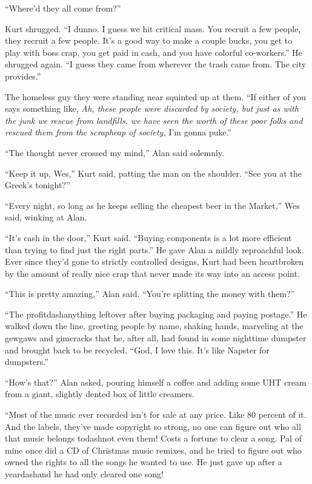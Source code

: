 ``Where'd they all come from?''

Kurt shrugged.  ``I dunno.  I guess we hit critical mass.  You recruit
a few people, they recruit a few people.  It's a good way to make a
couple bucks, you get to play with boss crap, you get paid in cash,
and you have colorful co-workers.'' He shrugged again.  ``I guess they
came from wherever the trash came from.  The city provides.''

The homeless guy they were standing near squinted up at them.  ``If
either of you says something like, \textit{Ah, these people were
discarded by society, but just as with the junk we rescue from
landfills, we have seen the worth of these poor folks and rescued them
from the scrapheap of society,} I'm gonna puke.''

``The thought never crossed my mind,'' Alan said solemnly.

``Keep it up, Wes,'' Kurt said, patting the man on the shoulder. 
``See you at the Greek's tonight?''

``Every night, so long as he keeps selling the cheapest beer in the
Market,'' Wes said, winking at Alan.

``It's cash in the door,'' Kurt said.  ``Buying components is a lot
more efficient than trying to find just the right parts.'' He gave
Alan a mildly reproachful look.  Ever since they'd gone to strictly
controlled designs, Kurt had been heartbroken by the amount of really
nice crap that never made its way into an access point.

``This is pretty amazing,'' Alan said.  ``You're splitting the money
with them?''

``The profitdash{}anything leftover after buying packaging and paying
postage.'' He walked down the line, greeting people by name, shaking
hands, marveling at the gewgaws and gimcracks that he, after all, had
found in some nighttime dumpster and brought back to be recycled. 
``God, I love this.  It's like Napster for dumpsters.''

``How's that?'' Alan asked, pouring himself a coffee and adding some
UHT cream from a giant, slightly dented box of little creamers.

``Most of the music ever recorded isn't for sale at any price.  Like
80 percent of it.  And the labels, they've made copyright so strong,
no one can figure out who all that music belongs todash{}not even them! 
Costs a fortune to clear a song.  Pal of mine once did a CD of
Christmas music remixes, and he tried to figure out who owned the
rights to all the songs he wanted to use.  He just gave up after a
yeardash{}and he had only cleared one song!

